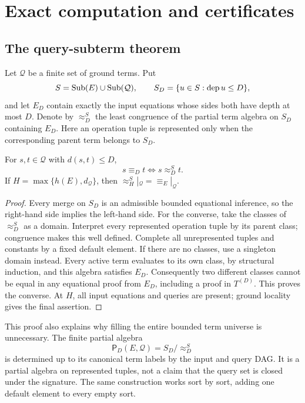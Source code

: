 \section{Exact computation and certificates}\label{sec:algorithm}

\subsection{The query-subterm theorem}
Let $\mathcal Q$ be a finite set of ground terms. Put
\[
S=\operatorname{Sub}(E)\cup\operatorname{Sub}(\mathcal Q),\qquad
S_D=\{u\in S:\operatorname{dep} u\le D\},
\]
and let $E_D$ contain exactly the input equations whose sides both have depth at most $D$. Denote by $\approx_D^S$ the least congruence of the partial term algebra on $S_D$ containing $E_D$. Here an operation tuple is represented only when the corresponding parent term belongs to $S_D$.

\begin{theorem}\label{thm:querysubterm}
For $s,t\in\mathcal Q$ with $d(s,t)\le D$,
\[
\boxed{s\equiv_D t\iff s\approx_D^S t.}
\]
If $H=\max\{h(E),d_{\mathcal Q}\}$, then
$\approx_H^S|_{\mathcal Q}=\equiv_E|_{\mathcal Q}$.
\end{theorem}
\begin{proof}
Every merge on $S_D$ is an admissible bounded equational inference, so the right-hand side implies the left-hand side. For the converse, take the classes of $\approx_D^S$ as a domain. Interpret every represented operation tuple by its parent class; congruence makes this well defined. Complete all unrepresented tuples and constants by a fixed default element. If there are no classes, use a singleton domain instead. Every active term evaluates to its own class, by structural induction, and this algebra satisfies $E_D$. Consequently two different classes cannot be equal in any equational proof from $E_D$, including a proof in $T^{(D)}$. This proves the converse. At $H$, all input equations and queries are present; ground locality gives the final assertion.
\end{proof}

This proof also explains why filling the entire bounded term universe is unnecessary. The finite partial algebra
\[
\mathsf P_D(E,\mathcal Q)=S_D/\!\approx_D^S
\]
is determined up to its canonical term labels by the input and query DAG. It is a partial algebra on represented tuples, not a claim that the query set is closed under the signature. The same construction works sort by sort, adding one default element to every empty sort.

